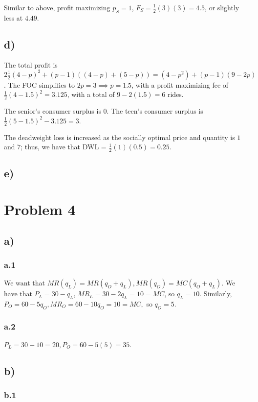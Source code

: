 \documentclass[12pt,letterpaper]{article}
\theoremstyle{definition}
\begin{document}
Similar to above, profit maximizing $p_S = 1$, $F_S = \frac{1}{2}(3)(3) = 4.5$, or
slightly less at $4.49$.

\subsection*{d)}

The total profit is $2\frac{1}{2}(4-p)^2 + (p-1)((4-p) + (5-p)) = (4-p^2) +
(p-1)(9-2p)$. The FOC simplifies to $2p = 3 \implies p = 1.5$, with a profit
maximizing fee of $\frac{1}{2}(4-1.5)^2 = 3.125$, with a total of $9 - 2(1.5) =
6$ rides.

The senior's consumer surplus is 0. The teen's consumer surplus is
$\frac{1}{2}(5-1.5)^2 - 3.125 = 3$.

The deadweight loss is increased as the socially optimal price and quantity
is $1$ and $7$; thus, we have that DWL = $\frac{1}{2}(1)(0.5) = 0.25$.

\subsection*{e)}

\section*{Problem 4}
\subsection*{a)}
\subsubsection*{a.1}

We want that $MR(q_L) = MR(q_O + q_L), MR(q_O) = MC(q_O + q_L)$. We have that
$P_L = 30 - q_L$, $MR_L = 30 -2 q_L = 10 = MC$, so $q_L = 10$. Similarly, $P_O =
60 - 5q_O, MR_O = 60 - 10q_O = 10 = MC,$ so $q_O = 5$.

\subsubsection*{a.2}

$P_L = 30 -10 = 20, P_O = 60 - 5(5) = 35$.

\subsection*{b)}
\subsubsection*{b.1}
\end{document}
